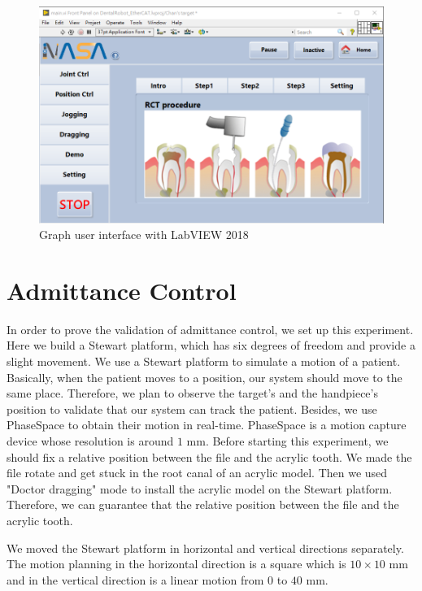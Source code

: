 \begin{figure}[htbp]
\begin{center}
\includegraphics[width=1\linewidth]{Images/GUI.png}
\caption{Graph user interface with LabVIEW 2018}
\label{fig:GUI}
\end{center}
\end{figure}
\section{Admittance Control}
\hspace*{6mm}In order to prove the validation of admittance control, we set up this experiment. Here we build a Stewart platform, which has six degrees of freedom and provide a slight movement. We use a Stewart platform to simulate a motion of a patient. Basically, when the patient moves to a position, our system should move to the same place. Therefore, we plan to observe the target's and the handpiece's position to validate that our system can track the patient. Besides, we use PhaseSpace to obtain their motion in real-time. PhaseSpace is a motion capture device whose resolution is around $1$ mm. Before starting this experiment, we should fix a relative position between the file and the acrylic tooth. We made the file rotate and get stuck in the root canal of an acrylic model. Then we used "Doctor dragging" mode to install the acrylic model on the Stewart platform. Therefore, we can guarantee that the relative position between the file and the acrylic tooth.
\par
We moved the Stewart platform in horizontal and vertical directions separately. The motion planning in the horizontal direction is a square which is $10\times 10$ mm and in the vertical direction is a linear motion from $0$ to $40$ mm.
